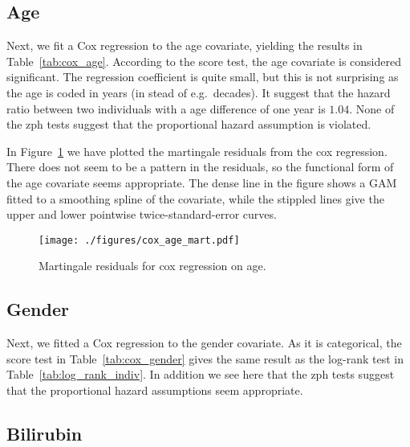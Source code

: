 \documentclass[11pt,a4paper]{article}
\begin{document}


\subsection{Age}

Next, we fit a Cox regression to the age covariate, yielding the results in Table~\ref{tab:cox_age}. According to the score test, the age covariate is considered significant.  The regression coefficient is quite small, but this is not surprising as the age is coded in years (in stead of e.g.\ decades). It suggest that the hazard ratio between two individuals with a age difference of one year is $1.04$.
None of the zph tests suggest that the proportional hazard assumption is violated.



In Figure~\ref{fig:cox_age_mart} we have plotted the martingale residuals from the cox regression. There does not seem to be a pattern in the residuals, so the functional form of the age covariate seems appropriate. The dense line in the figure shows a GAM fitted to a smoothing spline of the covariate, while the stippled lines give the upper and lower pointwise twice-standard-error curves.

\begin{figure}[h!tb]
    \begin{center}
        \texttt{[image: ./figures/cox\_age\_mart.pdf]}
    \end{center}
    \vspace{-0.2cm}
    \caption{Martingale residuals for cox regression on age.}
    \label{fig:cox_age_mart}
\end{figure}

\subsection{Gender}

Next, we fitted a Cox regression to the gender covariate. As it is categorical, the score test in Table~\ref{tab:cox_gender} gives the same result as the log-rank test in Table~\ref{tab:log_rank_indiv}. In addition we see here that the zph tests suggest that the proportional hazard assumptions seem appropriate.




\subsection{Bilirubin}
\end{document}
